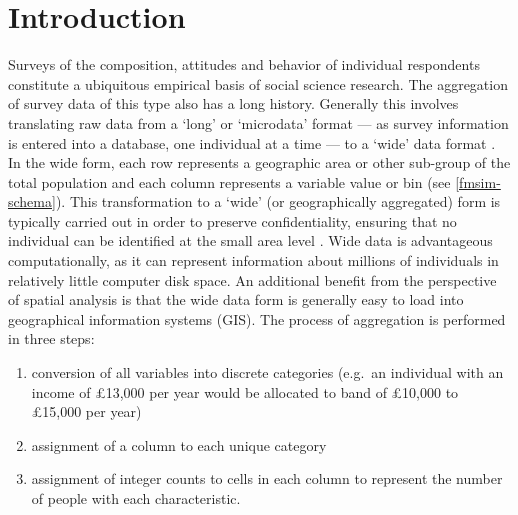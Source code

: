 \documentclass[a4paper,10pt]{article}
\begin{document}
\section{Introduction}
Surveys of the composition, attitudes and behavior of individual
respondents constitute a ubiquitous empirical basis of social science research.
The aggregation of survey data of this type also has a long history.
Generally this involves translating raw data from a `long' or `microdata' format
--- as survey information is entered into a database,
one individual at a time ---
to a `wide' data format \citep{van2012flexible}. In the wide form,
each row represents a geographic area or other sub-group of
the total population and each column represents a
variable value or bin (see \cref{fmsim-schema}). This transformation to a
`wide' (or geographically aggregated) form
 is typically carried out in order to preserve confidentiality,
ensuring that no individual can be identified at the small
area level \citep{dale1993census}. Wide data
is advantageous computationally, as it can represent information about millions of individuals
in relatively little computer disk space. An additional benefit from the
perspective of spatial analysis is that the wide data form is
generally easy to load into geographical information systems (GIS).
The process of aggregation is performed in three steps:  %
\begin{enumerate}
 \item conversion of all
variables into discrete categories (e.g.~an individual with an income of £13,000 per year
would be allocated to band of £10,000 to £15,000 per year)
 \item assignment of a column to each unique category
 \item assignment of
integer counts to cells in each column to represent the number of people with each characteristic.
\end{enumerate}
\end{document}
